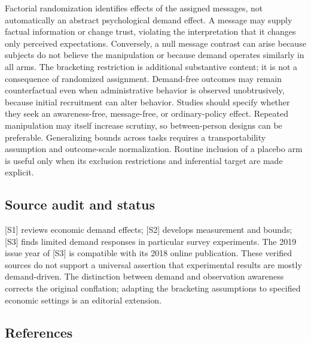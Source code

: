 \documentclass[11pt,a4paper]{article}
\begin{document}
Factorial randomization identifies effects of the assigned messages, not automatically an abstract psychological demand effect. A message may supply factual information or change trust, violating the interpretation that it changes only perceived expectations. Conversely, a null message contrast can arise because subjects do not believe the manipulation or because demand operates similarly in all arms. The bracketing restriction is additional substantive content; it is not a consequence of randomized assignment. Demand-free outcomes may remain counterfactual even when administrative behavior is observed unobtrusively, because initial recruitment can alter behavior. Studies should specify whether they seek an awareness-free, message-free, or ordinary-policy effect. Repeated manipulation may itself increase scrutiny, so between-person designs can be preferable. Generalizing bounds across tasks requires a transportability assumption and outcome-scale normalization. Routine inclusion of a placebo arm is useful only when its exclusion restrictions and inferential target are made explicit.

\subsection*{Source audit and status}

[S1] reviews economic demand effects; [S2] develops measurement and bounds; [S3] finds limited demand responses in particular survey experiments. The 2019 issue year of [S3] is compatible with its 2018 online publication. These verified sources do not support a universal assertion that experimental results are mostly demand-driven. The distinction between demand and observation awareness corrects the original conflation; adapting the bracketing assumptions to specified economic settings is an editorial extension.

\subsection*{References}
\end{document}
